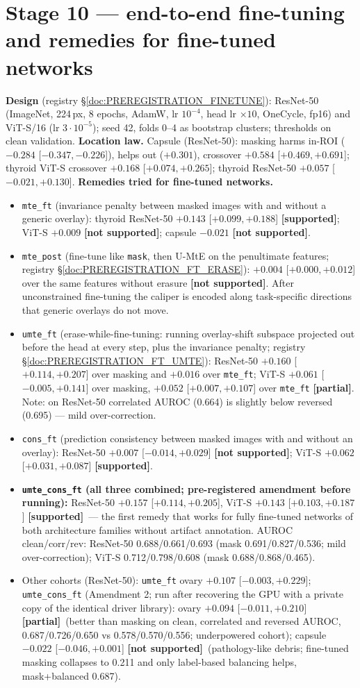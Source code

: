 \documentclass[10pt,a4paper]{article}
\newcommand{\ok}{\textcolor{green!50!black}{\textbf{[supported]}}}
\newcommand{\no}{\textcolor{red!70!black}{\textbf{[not supported]}}}
\newcommand{\mixed}{\textcolor{orange!80!black}{\textbf{[partial]}}}
\begin{document}
\section{Stage 10 --- end-to-end fine-tuning and remedies for fine-tuned networks}
\textbf{Design} (registry \S\ref{doc:PREREGISTRATION_FINETUNE}): ResNet-50 (ImageNet, 224\,px, 8 epochs, AdamW, lr
$10^{-4}$, head lr $\times10$, OneCycle, fp16) and ViT-S/16 (lr $3\cdot10^{-5}$); seed 42, folds 0--4 as bootstrap
clusters; thresholds on clean validation.
\textbf{Location law.} Capsule (ResNet-50): masking harms in-ROI ($-0.284$ [$-0.347,-0.226$]), helps out ($+0.301$),
crossover $+0.584$ [$+0.469,+0.691$]; thyroid ViT-S crossover $+0.168$ [$+0.074,+0.265$]; thyroid ResNet-50 $+0.057$
[$-0.021,+0.130$].
\textbf{Remedies tried for fine-tuned networks.}
\begin{itemize}[leftmargin=*]\itemsep0pt
\item \texttt{mte\_ft} (invariance penalty between masked images with and without a generic overlay): thyroid ResNet-50
$+0.143$ [$+0.099,+0.188$] \ok; ViT-S $+0.009$ \no; capsule $-0.021$ \no.
\item \texttt{mte\_post} (fine-tune like \texttt{mask}, then U-MtE on the penultimate features; registry
\S\ref{doc:PREREGISTRATION_FT_ERASE}): $+0.004$ [$+0.000,+0.012$] over the same features without erasure \no. After
unconstrained fine-tuning the caliper is encoded along task-specific directions that generic overlays do not move.
\item \texttt{umte\_ft} (erase-while-fine-tuning: running overlay-shift subspace projected out before the head at every
step, plus the invariance penalty; registry \S\ref{doc:PREREGISTRATION_FT_UMTE}): ResNet-50 $+0.160$ [$+0.114,+0.207$]
over masking and $+0.016$ over \texttt{mte\_ft}; ViT-S $+0.061$ [$-0.005,+0.141$] over masking, $+0.052$ [$+0.007,+0.107$]
over \texttt{mte\_ft} \mixed. Note: on ResNet-50 correlated AUROC (0.664) is slightly below reversed (0.695) --- mild
over-correction.
\item \texttt{cons\_ft} (prediction consistency between masked images with and without an overlay): ResNet-50 $+0.007$
[$-0.014,+0.029$] \no; ViT-S $+0.062$ [$+0.031,+0.087$] \ok.
\item \textbf{\texttt{umte\_cons\_ft} (all three combined; pre-registered amendment before running):} ResNet-50 $+0.157$
[$+0.114,+0.205$], ViT-S $+0.143$ [$+0.103,+0.187$] \ok\ --- the first remedy that works for fully fine-tuned networks of
both architecture families without artifact annotation. AUROC clean/corr/rev: ResNet-50 0.688/0.661/0.693 (mask
0.691/0.827/0.536; mild over-correction); ViT-S 0.712/0.798/0.608 (mask 0.688/0.868/0.465).
\item Other cohorts (ResNet-50): \texttt{umte\_ft} ovary $+0.107$ [$-0.003,+0.229$]; \texttt{umte\_cons\_ft} (Amendment 2; run after recovering the GPU with a private copy of the identical driver
library): ovary $+0.094$ [$-0.011,+0.210$] \mixed\ (better than masking on clean, correlated and reversed AUROC,
0.687/0.726/0.650 vs 0.578/0.570/0.556; underpowered cohort); capsule $-0.022$ [$-0.046,+0.001$] \no\ (pathology-like
debris; fine-tuned masking collapses to 0.211 and only label-based balancing helps, mask+balanced 0.687).
\end{itemize}
\end{document}
